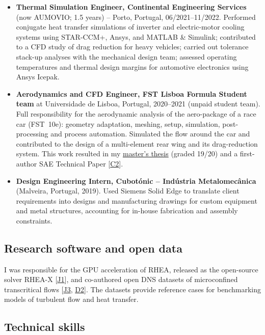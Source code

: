 \documentclass[11pt]{article}
\begin{document}
\begin{itemize}[itemsep=3pt]
	\item \textbf{Thermal Simulation Engineer, Continental Engineering Services} (now AUMOVIO; 1.5 years) -- Porto, Portugal, 06/2021--11/2022. Performed conjugate heat transfer simulations of inverter and electric-motor cooling systems using STAR-CCM+, Ansys, and MATLAB \& Simulink; contributed to a CFD study of drag reduction for heavy vehicles; carried out tolerance stack-up analyses with the mechanical design team;
	assessed operating temperatures and thermal design margins for automotive electronics using Ansys Icepak. 
	
	\item \textbf{Aerodynamics and CFD Engineer, FST Lisboa Formula Student team} at Universidade de Lisboa, Portugal, 2020--2021 (unpaid student team). Full responsibility for the aerodynamic analysis of the aero-package of a race car (FST~10e): geometry adaptation, meshing, setup, simulation, post-processing and process automation. Simulated the flow around the car and contributed to the design of a multi-element rear wing and its	drag-reduction system. This work resulted in my \href{http://hdl.handle.net/10362/149236}{master's thesis} (graded 19/20) and a first-author SAE Technical Paper [\hyperlink{pub-C2}{C2}].\nocert
	
	\item \textbf{Design Engineering Intern, Cubot\'onic -- Ind\'ustria Metalomec\^anica}
	(Malveira, Portugal, 2019).
	Used Siemens Solid Edge to translate client requirements into designs and manufacturing drawings for custom equipment and metal structures, accounting for in-house fabrication and assembly constraints.\nocert
\end{itemize}

\subsection{Research software and open data}

I was responsible for the GPU acceleration of RHEA, released as the open-source solver RHEA-X [\hyperlink{pub-J1}{J1}], and co-authored open DNS datasets of microconfined transcritical flows [\hyperlink{pub-J3}{J3}, \hyperlink{pub-D2}{D2}]. The datasets provide reference cases for benchmarking models of turbulent flow and heat transfer.

\subsection{Technical skills}
\end{document}
